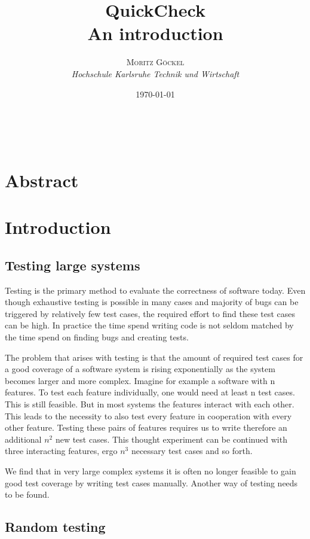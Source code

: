 \documentclass[a4paper, 12pt]{article} %
\title{\textbf{QuickCheck}\\ %
An introduction} %
\author{\textsc{Moritz G\"ockel} %
\\{\textit{Hochschule Karlsruhe Technik und Wirtschaft}}} %
\date{\today}
\makeatletter
\renewcommand{\maketitle}{ 
\begin{flushright} %
{\LARGE\@title} %

\vspace{50pt} %

{\large\@author}
\\\@date 

\vspace{40pt}
\end{flushright}
}
\makeatother
\begin{document}
\maketitle

\vspace{30pt}

\newpage
\tableofcontents
\newpage

\section{Abstract}

\section{Introduction}
\subsection{Testing large systems}

Testing is the primary method to evaluate the correctness of software today. \cite{Ammann2016} Even though exhaustive testing is possible in many cases and majority of bugs can be triggered by relatively few test cases, \cite{Kuhn2004} the required effort to find these test cases can be high. In practice the time spend writing code is not seldom matched by the time spend on finding bugs and creating tests.

The problem that arises with testing is that the amount of required test cases for a good coverage of a software system is rising exponentially as the system becomes larger and more complex. Imagine for example a software with n features. To test each feature individually, one would need at least n test cases. This is still feasible. But in most systems the features interact with each other. This leads to the necessity to also test every feature in cooperation with every other feature. Testing these pairs of features requires us to write therefore an additional $n^2$  new test cases. This thought experiment can be continued with three interacting features, ergo $n^3$ necessary test cases and so forth. \cite{Hughes2016}

We find that in very large complex systems it is often no longer feasible to gain good test coverage by writing test cases manually. Another way of testing needs to be found. 

\subsection{Random testing}
\end{document}
